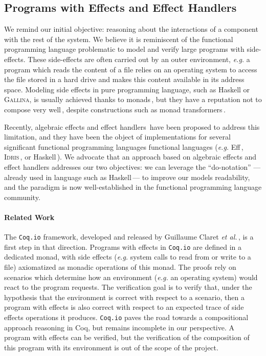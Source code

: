 
\subsection{Programs with Effects and Effect Handlers}
\label{subsec:sota:peff}

We remind our initial objective: reasoning about the interactions of a component
with the rest of the system.
%
We believe it is reminiscent of the functional programming language problematic
to model and verify large programs with side-effects.
%
These side-effects are often carried out by an outer environment, \emph{e.g.} a
program which reads the content of a file relies on an operating system to
access the file stored in a hard drive and makes this content available in its
address space.
%
Modeling side effects in pure programming language, such as Haskell or {\scshape
  Gallina}, is usually achieved thanks to
monads\,\cite{wadler1990comprehending,jones2005io}, but they have a reputation
not to compose very well\,\cite{hyland2006combining}, despite constructions such
as monad transformers\,\cite{liang1995mtl}.

Recently, algebraic effects and effect handlers\,\cite{bauer2015effects} have
been proposed to address this limitation, and they have been the object of
implementations for several significant functional programming languages
functional languages (\emph{e.g.}  Eff\,\cite{bauer2015effects}, {\scshape
  Idris}\,\cite{brady2013idris}, or Haskell\,\cite{kiselyov2013extensible}).
%
We advocate that an approach based on algebraic effects and effect handlers
addresses our two objectives: we can leverage the ``do-notation'' ---already
used in language such as Haskell\,\cite{haskell13}--- to improve our models
readability, and the paradigm is now well-established in the functional
programming language community.

\paragraph{Related Work}
%
The \texttt{Coq.io} framework, developed and released by Guillaume Claret
\emph{et al.}\,\cite{claret2015coqiowww}, is a first step in that direction.
%
Programs with effects in \texttt{Coq.io} are defined in a dedicated monad, with
side effects (\emph{e.g.}  system calls to read from or write to a file)
axiomatized as monadic operations of this monad.
%
The proofs rely on scenarios which determine how an environment (\emph{e.g.} an
operating system) would react to the program requests.
%
The verification goal is to verify that, under the hypothesis that the
environment is correct with respect to a scenario, then a program with effects
is also correct with respect to an expected trace of side effects operations it
produces.
%
\texttt{Coq.io} paves the road towards a compositional approach reasoning in
Coq, but remains incomplete in our perspective.
%
A program with effects can be verified, but the verification of the composition
of this program with its environment is out of the scope of the project.


